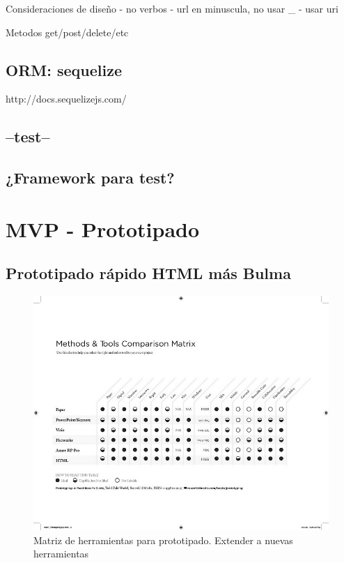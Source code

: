 Consideraciones de diseño 
  - no verbos
  - url en minuscula, no usar _ 
  - usar uri
  
Metodos get/post/delete/etc

\subsection{ORM: sequelize}
http://docs.sequelizejs.com/

\subsection{--test--}
\subsection{¿Framework para test?}


\section{MVP - Prototipado}
\subsection{Prototipado rápido HTML más Bulma}

\begin{figure}
\centering
\includegraphics[width=16cm]{Img/UX/UX-matrix.jpg}
\caption[Proto-persona (optional short caption)]{\label{us_figure} Matriz de herramientas para prototipado. Extender a nuevas herramientas}
\end{figure}

